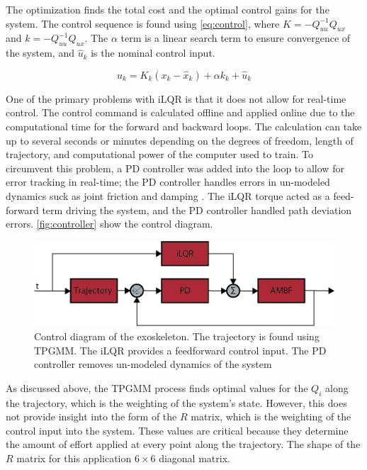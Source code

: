 The optimization finds the total cost and the optimal control gains for the system. The control sequence is found using \autoref{eq:control}, where $K=-Q_{uu}^{-1}Q_{ux}$ and $k=-Q^{-1}_{uu} Q_{ux}$. The $\alpha$ term is a linear search term to ensure convergence of the system, and $\hat{u}_k$ is the nominal control input. 


\begin{equation}
    u_k = K_k (x_k - \hat{x}_k) + \alpha k_k + \hat{u}_k
    \label{eq:control}
\end{equation}

One of the primary problems with iLQR is that it does not allow for real-time control. The control command is calculated offline and applied online due to the computational time for the forward and backward loops. The calculation can take up to several seconds or minutes depending on the degrees of freedom, length of trajectory, and computational power of the computer used to train. To circumvent this problem, a PD controller was added into the loop to allow for error tracking in real-time; the PD controller handles errors in un-modeled dynamics suck as joint friction and damping \cite{iLQR_tassa2014}. The iLQR torque acted as a feed-forward term driving the system, and the PD controller handled path deviation errors. \autoref{fig:controller} show the control diagram. 

\begin{figure}[H]
    \centering
    \includegraphics[width=\linewidth]{images/controllers/iLQR.png}
    \caption[iLQR Control Diagram]{Control diagram of the exoskeleton. The trajectory is found using TPGMM. The iLQR provides a feedforward control input. The PD controller removes un-modeled dynamics of the system }
    \label{fig:controller}
\end{figure}

As discussed above, the TPGMM process finds optimal values for the $Q_i$ along the trajectory, which is the weighting of the system's state. However, this does not provide insight into the form of the $R$ matrix, which is the weighting of the control input into the system. These values are critical because they determine the amount of effort applied at every point along the trajectory. The shape of the $R$ matrix for this application  $6 \times 6$ diagonal matrix.


